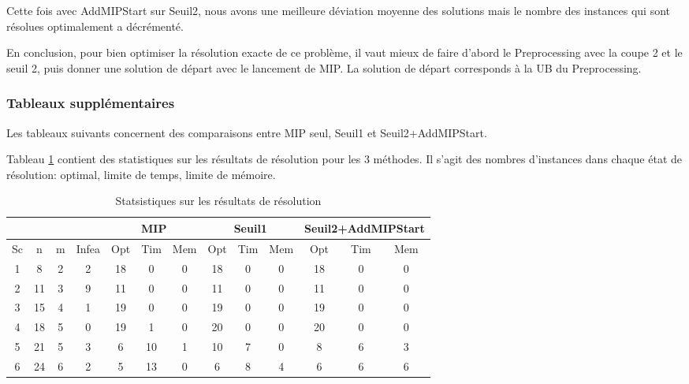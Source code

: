 Cette fois avec AddMIPStart sur Seuil2, nous avons une meilleure déviation moyenne des solutions mais le nombre des instances qui sont résolues optimalement a décrémenté. 

En conclusion, pour bien optimiser la résolution exacte de ce problème, il vaut mieux de faire d'abord le Preprocessing avec la coupe 2 et le seuil 2, puis donner une solution de départ avec le lancement de MIP. La solution de départ corresponds à la UB du Preprocessing.




\subsubsection{Tableaux supplémentaires}
Les tableaux suivants concernent des comparaisons entre MIP seul, Seuil1 et Seuil2+AddMIPStart.

Tableau \ref{tab_mip_s1_ams2_stats} contient des statistiques sur les résultats de résolution pour les 3 méthodes. Il s'agit des nombres d'instances dans chaque état de résolution: optimal, limite de temps, limite de mémoire. 
\begin{table}[h]
    \centering
\begin{tabular}{|c|c|c|c|c|c|c|c|c|c|c|c|c|} 
\hline
&&&&\multicolumn{3}{c|}{MIP} &\multicolumn{3}{c|}{Seuil1}&\multicolumn{3}{c|}{Seuil2+AddMIPStart}  \\ \hline
Sc&n&m & Infea & Opt	& Tim & Mem  & Opt	& Tim & Mem   & Opt	& Tim & Mem \\ \hline
1&  	8	&2	& 2 & 18 & 0 & 0 & 18	& 0	& 0&18	&0	&0\\ \hline
2& 	    11	&3	& 9 & 11 & 0 & 0 & 11	& 0	& 0&11	&0	&0\\ \hline
3&  	15	&4	& 1 & 19 & 0 & 0 & 19	& 0	& 0&19	&0	&0\\ \hline
4&		18	&5	& 0 & 19 & 1 & 0 & 20	&0	&0&	20	&0	&0\\ \hline
5&		21	&5	& 3 & 6 &  10 & 1 &10	&7	&0&	8	&6	&3\\ \hline
6&		24	&6	& 2 & 5 &  13 & 0 &6	&8	&4&	6	&6	&6\\ \hline  
\end{tabular}
\caption{Statsistiques sur les résultats de résolution}
    \label{tab_mip_s1_ams2_stats}
\end{table}
\bigskip

